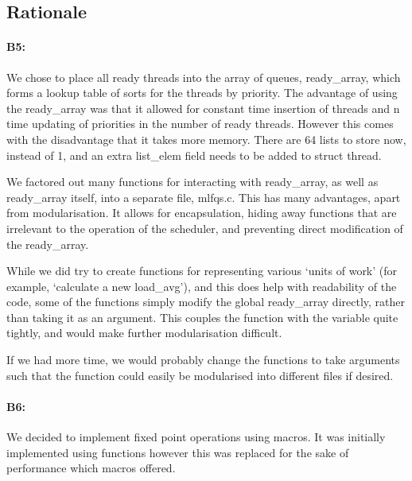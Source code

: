 \subsection{Rationale}
\paragraph{B5:} %

We chose to place all ready threads into the array of queues, ready\_array,
which forms a lookup table of sorts for the threads by priority. The advantage
of using the ready\_array was that it allowed for constant time insertion of
threads and n time updating of priorities in the number of ready
threads. However this comes with the disadvantage that it takes more
memory. There are 64 lists to store now, instead of 1, and an extra list\_elem
field needs to be added to struct thread.

We factored out many functions for interacting with ready\_array, as well as
ready\_array itself, into a separate file, mlfqs.c. This has many advantages,
apart from modularisation. It allows for encapsulation, hiding away functions
that are irrelevant to the operation of the scheduler, and preventing direct
modification of the ready\_array.

While we did try to create functions for representing various `units of work'
(for example, `calculate a new load\_avg'), and this does help with readability
of the code, some of the functions simply modify the global ready\_array
directly, rather than taking it as an argument. This couples the function with
the variable quite tightly, and would make further modularisation difficult.

If we had more time, we would probably change the functions to take arguments
such that the function could easily be modularised into different files if
desired.

\paragraph{B6:} %
We decided to implement fixed point operations using macros. It was initially
implemented using functions however this was replaced for the sake of
performance which macros offered.

